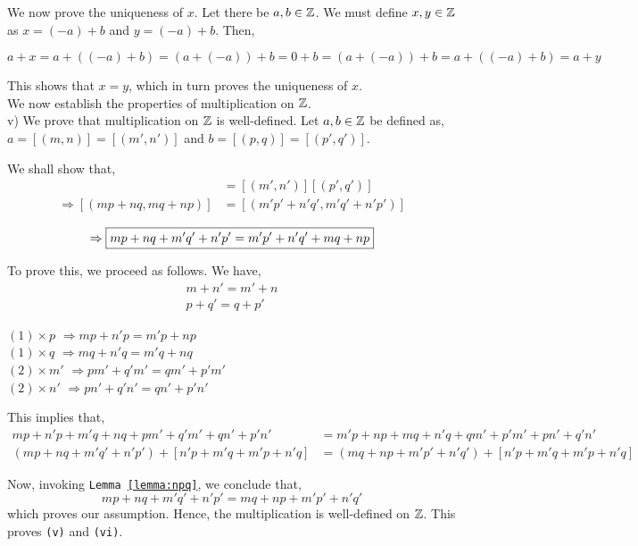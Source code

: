 \documentclass[11pt]{scrartcl}
\begin{document}
 	We now prove the  uniqueness of $x$. Let there be $a,b \in \mathbb Z$. We must define $x,y \in \mathbb Z$ as $x = (-a)+b$ and $y = (-a)+b$. Then,\\
 	\begin{center}
 		$a+x = a+((-a)+b) = (a+(-a))+b = 0+b = (a+(-a))+b = a+((-a)+b) = a+y$
 	\end{center}
 	This shows that $x=y$, which in turn proves the uniqueness of $x$.\\[10pt]
 	
 	We now establish the properties of multiplication on $\mathbb Z$.\\[10pt]
 	
 	v) We prove that multiplication on $\mathbb Z$ is well-defined. Let $a,b \in \mathbb Z$ be defined as, $a = [(m,n)] = [(m',n')]$ and $b = [(p,q)] = [(p',q')]$.
 	
 	We shall show that,
 	\begin{align*}
 		[(m,n)][(p,q)] &=  [(m',n')][(p',q')]\\
 		\Rightarrow[(mp+nq, mq+np)] &= [(m'p'+n'q', m'q'+n'p')]\\ 
 	\end{align*}
 	$$\Rightarrow \boxed{mp+nq+m'q'+n'p' = m'p'+n'q'+mq+np}\\$$
 	
 	To prove this, we proceed as follows. We have,\\
 	\begin{align}
 		m+n' = m'+n\\
 		p+q' = q+p'
 	\end{align}
 	\begin{flushleft}
 	$(1) \times p$ $\Rightarrow mp+n'p = m'p+np$\\
 	$(1) \times q$ $\Rightarrow mq+n'q = m'q+nq$\\
 	$(2) \times m'$ $\Rightarrow pm'+q'm' = qm'+p'm'$\\
 	$(2) \times n'$ $\Rightarrow pn'+q'n' = qn'+p'n'$\\
 	\end{flushleft}
 	This implies that,
 	\begin{align*}
 		mp+n'p+m'q+nq+pm'+q'm'+qn'+p'n' &= m'p+np+mq+n'q+qm'+p'm'+pn'+q'n'\\
 		(mp+nq+m'q'+n'p')+[n'p+m'q+m'p+n'q] &= (mq+np+m'p'+n'q')+[n'p+m'q+m'p+n'q]
 	\end{align*}
 
 	Now, invoking \texttt{Lemma \ref{lemma:npq}}, we conclude that,
 	$$mp+nq+m'q'+n'p' = mq+np+m'p'+n'q'$$
 	which proves our assumption. Hence, the multiplication is well-defined on $\mathbb Z$. This proves \texttt{(v)} and \texttt{(vi)}.\\[10pt]
 	
\end{document}
